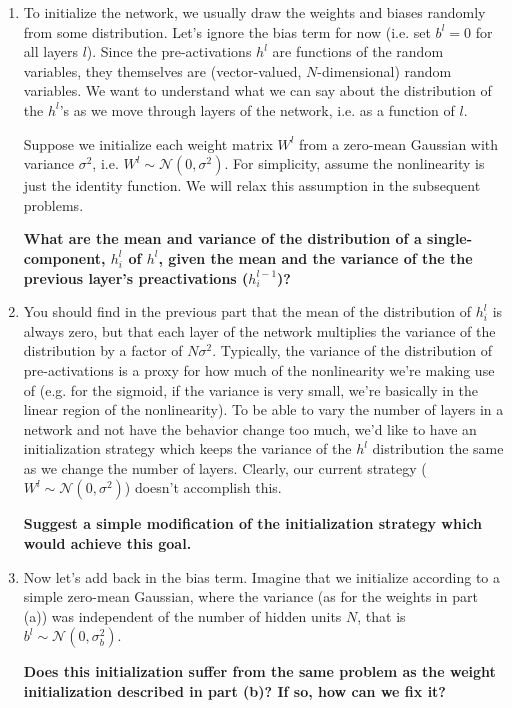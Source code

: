 \documentclass[a4paper]{article}
\begin{document}
\begin{enumerate}[label=(\alph*)]
\item To initialize the network, we usually draw the weights and biases randomly from some distribution.  Let's ignore the bias term for now (i.e. set $b^l=0$ for all layers $l$).  Since the pre-activations $h^l$ are functions of the random variables, they themselves are (vector-valued, $N$-dimensional) random variables. We want to understand what we can say about the distribution of the $h^l$'s as we move through layers of the network, i.e. as a function of $l$.  

Suppose we initialize each weight matrix $W^l$ from a zero-mean Gaussian with variance $\sigma^2$, i.e. $W^l \sim \mathcal{N}(0, \sigma^2)$. For simplicity, assume the nonlinearity is just the identity function.  We will relax this assumption in the subsequent problems.  


\textbf{What are the mean and variance of the distribution of a single-component, $h^l_i$ of $h^l$, given the mean and the variance of the the previous layer's preactivations ($h^{l-1}_i$)?}


\item You should find in the previous part that the mean of the distribution of $h^l_i$ is always zero, but that each layer of the network multiplies the variance of the distribution by a factor of $N\sigma^2$.  Typically, the variance of the distribution of pre-activations is a proxy for how much of the nonlinearity we're making use of (e.g. for the sigmoid, if the variance is very small, we're basically in the linear region of the nonlinearity).  To be able to vary the number of layers in a network and not have the behavior change too much, we'd like to have an initialization strategy which keeps the variance of the $h^l$ distribution the same as we change the number of layers.  Clearly, our current strategy ($W^l \sim \mathcal{N}(0, \sigma^2)$) doesn't accomplish this. 

\textbf{Suggest a simple modification of the initialization strategy which would achieve this goal.}


\item Now let's add back in the bias term.  Imagine that we initialize according to a simple zero-mean Gaussian, where the variance (as for the weights in part (a)) was independent of the number of hidden units $N$, that is $b^l \sim \mathcal{N}(0, \sigma_b^2)$.  

\textbf{Does this initialization suffer from the same problem as the weight initialization described in part (b)?  If so, how can we fix it?}

\end{enumerate}
\end{document}
